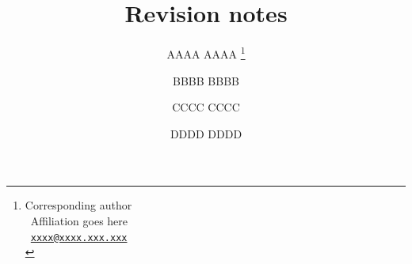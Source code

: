 \documentclass[9pt,draft]{extarticle}
\title{\textbf{\PaperTitle} \\ {\Large Revision notes}}
\author[1]{AAAA AAAA%
  \thanks{Corresponding author \\
    {\Letter}~{Affiliation goes here} \\
    {\Email}~\texttt{\href{mailto:xxxx@xxxx.xxx.xxx}{xxxx@xxxx.xxx.xxx}} \\
  }
}
\author[2]{BBBB BBBB}
\author[3]{CCCC CCCC}
\author[4]{DDDD DDDD}
\affil[1]{1st Affiliation}
\affil[2]{2nd Affiliation}
\affil[3]{3rd Affiliation}
\affil[4]{4th Affiliation}
\date{}
\begin{document}
\maketitle


\vfill

\vfill
\pagebreak









\end{document}
